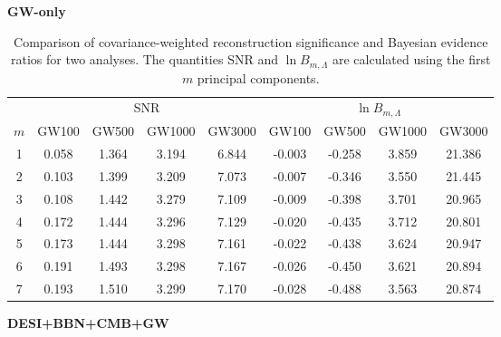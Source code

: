 \begin{table}[t]
\caption{
Comparison of covariance-weighted reconstruction significance and Bayesian
evidence ratios for two analyses.
The quantities SNR and $\ln B_{m,\Lambda}$ are calculated using the first
$m$ principal components.
}
\label{tab:gw_and_desi_bbn_cmb_gw_pca_snr_bayes}

\centering

\textbf{GW-only}

\vspace{0.2cm}

\begin{ruledtabular}
\begin{tabular}{c|cccc|cccc}
& \multicolumn{4}{c|}{SNR}
& \multicolumn{4}{c}{$\ln B_{m,\Lambda}$}
\\
$m$
& GW100 & GW500 & GW1000 & GW3000
& GW100 & GW500 & GW1000 & GW3000
\\
\hline
1 & 0.058 & 1.364 & 3.194 & 6.844 & -0.003 & -0.258 & 3.859 & 21.386\\
2 & 0.103 & 1.399 & 3.209 & 7.073 & -0.007 & -0.346 & 3.550 & 21.445\\
3 & 0.108 & 1.442 & 3.279 & 7.109 & -0.009 & -0.398 & 3.701 & 20.965\\
4 & 0.172 & 1.444 & 3.296 & 7.129 & -0.020 & -0.435 & 3.712 & 20.801\\
5 & 0.173 & 1.444 & 3.298 & 7.161 & -0.022 & -0.438 & 3.624 & 20.947\\
6 & 0.191 & 1.493 & 3.298 & 7.167 & -0.026 & -0.450 & 3.621 & 20.894\\
7 & 0.193 & 1.510 & 3.299 & 7.170 & -0.028 & -0.488 & 3.563 & 20.874\\
\end{tabular}
\end{ruledtabular}


\vspace{0.5cm}


\textbf{DESI+BBN+CMB+GW}

\vspace{0.2cm}


\end{table}

